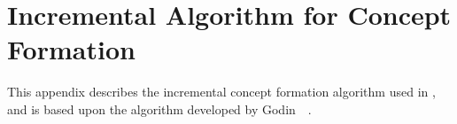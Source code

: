 \chapter{Incremental Algorithm for Concept Formation}
\label{chapter:appendix:concept-analysis}

This appendix describes the incremental concept formation algorithm used in
, and is based upon the algorithm developed by
Godin~\etal~\cite{}.

